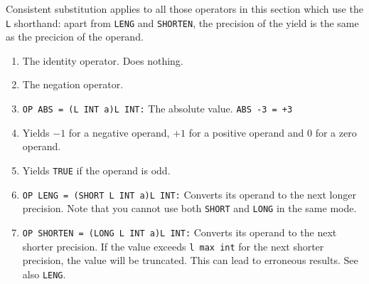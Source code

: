 Consistent substitution applies to all those operators in this section
which use the \verb|L| shorthand: apart from \verb|LENG| and
\verb|SHORTEN|, the precision of the yield is the same as the precicion
of the operand.
\begin{enumerate}
\item {}\newline
The identity operator. Does nothing.
\item {}\newline
The negation operator.
\item \verb|OP ABS = (L INT a)L INT:|\newline
The absolute value. \verb|ABS -3 = +3|
\item {}\newline
Yields $-1$ for a negative operand, $+1$ for a positive operand and $0$
for a zero operand.
\item {} \newline
Yields \verb|TRUE| if the operand is odd.
\item {} \newline
\verb|OP LENG = (SHORT L INT a)L INT:| \newline
Converts its operand to the next longer precision. Note that you cannot
use both \verb|SHORT| and \verb|LONG| in the same mode.
\item {}
\newline
\verb|OP SHORTEN = (LONG L INT a)L INT:| \newline
Converts its operand to the next shorter precision. If the value
exceeds \verb|l max int| for the next shorter precision, the value will
be truncated. This can lead to erroneous results. See also \verb|LENG|.
\end{enumerate}

